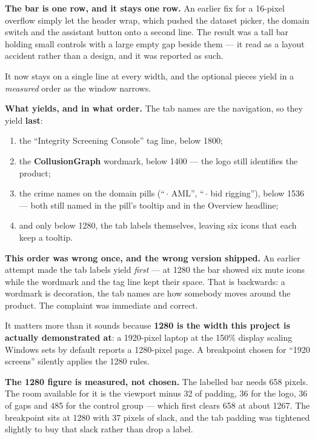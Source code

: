 \documentclass[11pt,a4paper]{article}
\begin{document}
\begin{plain}
\textbf{The bar is one row, and it stays one row.} An earlier fix for a 16-pixel
overflow simply let the header wrap, which pushed the dataset picker, the domain
switch and the assistant button onto a second line. The result was a tall bar
holding small controls with a large empty gap beside them --- it read as a
layout accident rather than a design, and it was reported as such.

It now stays on a single line at every width, and the optional pieces yield in a
\emph{measured} order as the window narrows.

\textbf{What yields, and in what order.} The tab names are the navigation, so
they yield \textbf{last}:

\begin{enumerate}
  \item the ``Integrity Screening Console'' tag line, below 1800;
  \item the \textbf{CollusionGraph} wordmark, below 1400 --- the logo still
        identifies the product;
  \item the crime names on the domain pills (``\,$\cdot$ AML'', ``\,$\cdot$ bid
        rigging''), below 1536 --- both still named in the pill's tooltip and in
        the Overview headline;
  \item and only below 1280, the tab labels themselves, leaving six icons that
        each keep a tooltip.
\end{enumerate}

\begin{warnbox}
\textbf{This order was wrong once, and the wrong version shipped.} An earlier
attempt made the tab labels yield \emph{first} --- at 1280 the bar showed six
mute icons while the wordmark and the tag line kept their space. That is
backwards: a wordmark is decoration, the tab names are how somebody moves around
the product. The complaint was immediate and correct.

It matters more than it sounds because \textbf{1280 is the width this project is
actually demonstrated at}: a 1920-pixel laptop at the 150\% display scaling
Windows sets by default reports a 1280-pixel page. A breakpoint chosen for
``1920 screens'' silently applies the 1280 rules.
\end{warnbox}

\textbf{The 1280 figure is measured, not chosen.} The labelled bar needs
658 pixels. The room available for it is the viewport minus 32 of padding, 36
for the logo, 36 of gaps and 485 for the control group --- which first clears
658 at about 1267. The breakpoint sits at 1280 with 37 pixels of slack, and the
tab padding was tightened slightly to buy that slack rather than drop a label.


\end{plain}
\end{document}
